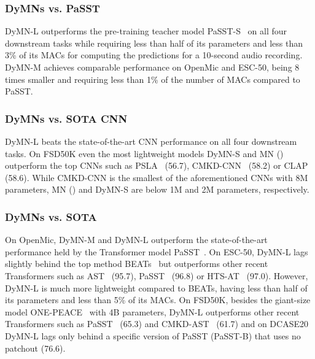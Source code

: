 \documentclass[lettersize,journal]{IEEEtran}
\begin{document}
\subsubsection{DyMNs vs. PaSST} DyMN-L outperforms the pre-training teacher model PaSST-S~\cite{Koutini21Passt} on all four downstream tasks while requiring less than half of its parameters and less than 3\% of its MACs for computing the predictions for a 10-second audio recording. DyMN-M achieves comparable performance on OpenMic and ESC-50, being 8 times smaller and requiring less than 1\% of the number of MACs compared to PaSST.

\subsubsection{DyMNs vs. SOTA CNN} DyMN-L beats the state-of-the-art CNN performance on all four downstream tasks. On FSD50K even the most lightweight models DyMN-S and MN () outperform the top CNNs such as PSLA~\cite{Gong21PSLA} (56.7), CMKD-CNN~\cite{Gong22CMKD} (58.2) or CLAP~\cite{elizalde2023clap} (58.6). While CMKD-CNN is the smallest of the aforementioned CNNs with 8M parameters, MN () and DyMN-S are below 1M and 2M parameters, respectively.  



\subsubsection{DyMNs vs. SOTA}
On OpenMic, DyMN-M and DyMN-L outperform the state-of-the-art performance held by the Transformer model PaSST~\cite{Koutini21Passt}. On ESC-50, DyMN-L lags slightly behind the top method BEATs~\cite{chen2022beats} but outperforms other recent Transformers such as AST~\cite{Gong21Ast} (95.7), PaSST~\cite{Koutini21Passt} (96.8) or HTS-AT~\cite{Chen22HTS-AT} (97.0). However, DyMN-L is much more lightweight compared to BEATs, having less than half of its parameters and less than 5\% of its MACs. On FSD50K, besides the giant-size model ONE-PEACE~\cite{wang2023one} with 4B parameters, DyMN-L outperforms other recent Transformers such as PaSST~\cite{Koutini21Passt} (65.3) and CMKD-AST~\cite{Gong22CMKD} (61.7) and on DCASE20 DyMN-L lags only behind a specific version of PaSST (PaSST-B) that uses no patchout (76.6).
\end{document}
